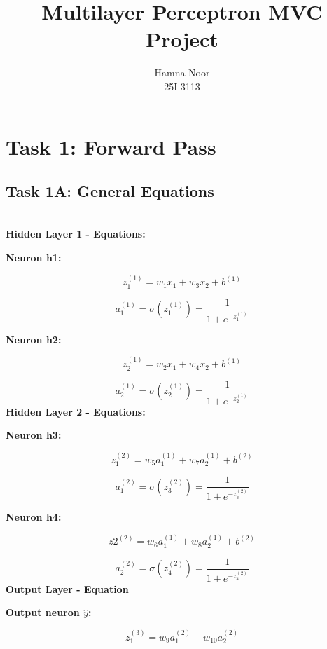 \documentclass[runningheads]{llncs}
\begin{document}
\title{Multilayer Perceptron MVC Project}
\author{Hamna Noor \\ 25I-3113}
\maketitle



\section{Task 1: Forward Pass}
\subsection{Task 1A: General Equations}
\\
\textbf{Hidden Layer 1 - Equations:\\}

\textbf{Neuron h1:}

\[
z_1^{(1)} = w_1 x_1 + w_3 x_2 + b^{(1)}
\]

\[
a_1^{(1)} = \sigma(z_1^{(1)}) = \frac{1}{1 + e^{-z_1^{(1)}}}
\]

\textbf{Neuron h2:}

\[
z_2^{(1)} = w_2 x_1 + w_4 x_2 + b^{(1)}
\]

\[
a_2^{(1)} = \sigma(z_2^{(1)}) = \frac{1}{1 + e^{-z_2^{(1)}}}
\]
\textbf{Hidden Layer 2 - Equations:\\}

\textbf{Neuron h3:}

\[
z_1^{(2)} = w_5 a_1^{(1)} + w_7 a_2^{(1)} + b^{(2)}
\]

\[
a_1^{(2)} = \sigma(z_3^{(2)}) = \frac{1}{1 + e^{-z_3^{(2)}}}
\]

\textbf{Neuron h4:}

\[
z2^{(2)} = w_6 a_1^{(1)} + w_8 a_2^{(1)} + b^{(2)}
\]

\[
a_2^{(2)} = \sigma(z_4^{(2)}) = \frac{1}{1 + e^{-z_4^{(2)}}}
\]
\textbf{Output Layer - Equation\\}

\textbf{Output neuron $\hat{y}$:}

\[
z_1^{(3)} = w_9 a_1^{(2)} + w_{10}  a_2^{(2)} 
\]
\end{document}

